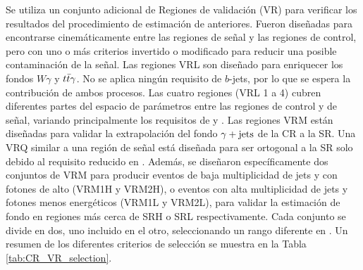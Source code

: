Se utiliza un conjunto adicional de Regiones de validación (VR) para verificar
los resultados del procedimiento de estimación de anteriores. Fueron diseñadas para encontrarse
cinemáticamente entre las regiones de señal y las regiones de control, pero con uno o más criterios
invertido o modificado para reducir una posible contaminación de la señal. Las regiones VRL son
diseñado para enriquecer los fondos $ W \gamma $ y $ t\bar{t}\gamma $. No se aplica ningún requisito de $ b $-jets,
por lo que se espera la contribución de ambos procesos. Las cuatro regiones (VRL 1 a 4) cubren
diferentes partes del espacio de parámetros entre las regiones de control y de señal, variando principalmente los requisitos de \met y \HT.
Las regiones VRM están diseñadas para validar la extrapolación del fondo $ \gamma + \text{jets}$ de la CR a la SR.
Una VRQ similar a una región de señal está diseñada para ser ortogonal a la SR solo debido al requisito reducido en \met.
Además, se diseñaron específicamente dos conjuntos de VRM para producir eventos de baja multiplicidad de jets y con fotones de alto \pt (VRM1H y VRM2H), o eventos con alta multiplicidad de jets y fotones menos energéticos (VRM1L y VRM2L), para validar la estimación de fondo en regiones
más cerca de SRH o SRL respectivamente. Cada conjunto se divide en dos, uno incluido en el otro, seleccionando un rango diferente en \met.
Un resumen de los diferentes criterios de selección se muestra en la Tabla \ref{tab:CR_VR_selection}. 

